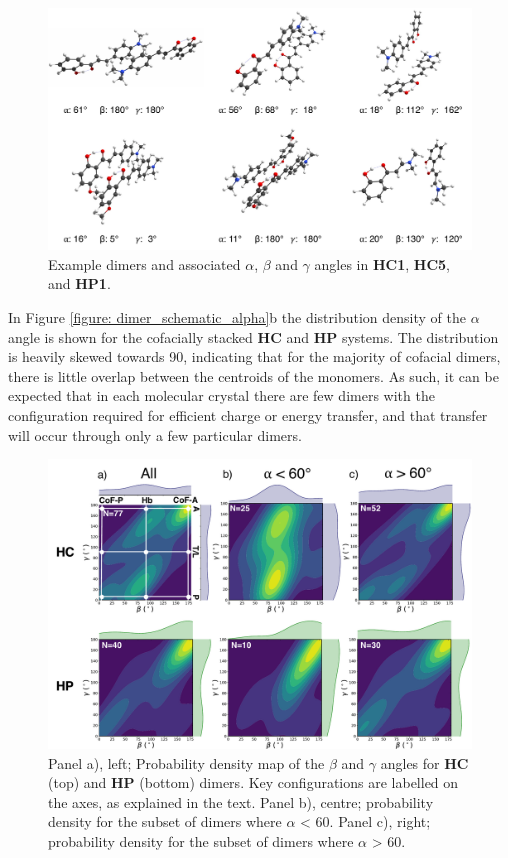 \begin{figure}[t]
\centering
  \includegraphics[width=0.9\linewidth]{5ConnectingCrystalStructure/motif_examples}
  \caption[Example dimers in \textbf{HC1}, \textbf{HC5}, and \textbf{HP1}.]{Example dimers and associated $\alpha$, $\beta$ and $\gamma$ angles in \textbf{HC1}, \textbf{HC5}, and \textbf{HP1}.}
  \label{figure: motif_examples}
\end{figure}

In Figure \ref{figure: dimer_schematic_alpha}b the distribution density of the $\alpha$ angle is shown for the cofacially stacked \textbf{HC} and \textbf{HP} systems. The distribution is heavily skewed towards 90\degree, indicating that for the majority of cofacial dimers, there is little overlap between the centroids of the monomers. As such, it can be expected that in each molecular crystal there are few dimers with the configuration required for efficient charge or energy transfer, and that transfer will occur through only a few particular dimers. 
\begin{figure}[t]
\centering
  \includegraphics[width=0.9\linewidth]{5ConnectingCrystalStructure/dimer_classification}
  \caption[Probability density maps of $\beta$ and $\gamma$ angles.]{Panel a), left; Probability density map of the $\beta$ and $\gamma$ angles for \textbf{HC} (top) and \textbf{HP} (bottom) dimers. Key configurations are labelled on the axes, as explained in the text. Panel b), centre; probability density for the subset of dimers where $\alpha$ \textless{}  60\degree{}.  Panel c), right; probability density for the subset of dimers where $\alpha$ \textgreater{} 60\degree{}.}
  \label{figure: dimer_classification}
\end{figure}

